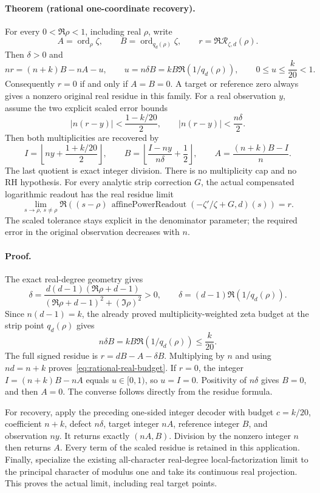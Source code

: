 \paragraph{Theorem (rational one-coordinate recovery).}
For every \(0<\Re\rho<1\), including real \(\rho\), write
\[
 A=\operatorname{ord}_{\rho}\zeta,\qquad
 B=\operatorname{ord}_{q_d(\rho)}\zeta,\qquad
 r=\Re\mathcal R_{\zeta,d}(\rho).
\]
Then \(\delta>0\) and
\begin{equation}\label{eq:rational-real-budget}
 nr=(n+k)B-nA-u,\qquad
 u=n\delta B=kB\Re(1/q_d(\rho)),\qquad
 0\le u\le\frac{k}{20}<1.
\end{equation}
Consequently \(r=0\) if and only if \(A=B=0\). A target or reference zero
always gives a nonzero original real residue in this family.
For a real observation \(y\), assume the two explicit scaled error bounds
\[
 |n(r-y)|<\frac{1-k/20}{2},\qquad
 |n(r-y)|<\frac{n\delta}{2}.
\]
Then both multiplicities are recovered by
\[
 I=\left\lfloor ny+\frac{1+k/20}{2}\right\rfloor,\qquad
 B=\left\lfloor\frac{I-ny}{n\delta}+\frac12\right\rfloor,
 \qquad A=\frac{(n+k)B-I}{n}.
\]
The last quotient is exact integer division. There is no multiplicity cap
and no RH hypothesis. For every analytic strip correction \(G\), the
actual compensated logarithmic readout has the real residue limit
\[
 \lim_{s\to\rho,\ s\ne\rho}
 \Re\!\left((s-\rho)\,
 \operatorname{affinePowerReadout}(-\zeta'/\zeta+G,d)(s)\right)=r.
\]
The scaled tolerance stays explicit in the denominator parameter; the
required error in the original observation decreases with \(n\).

\paragraph{Proof.}
The exact real-degree geometry gives
\[
 \delta=\frac{d(d-1)(\Re\rho+d-1)}
 {(\Re\rho+d-1)^2+(\Im\rho)^2}>0,
 \qquad \delta=(d-1)\Re(1/q_d(\rho)).
\]
Since \(n(d-1)=k\), the already proved multiplicity-weighted zeta budget
at the strip point \(q_d(\rho)\) gives
\[
 n\delta B=kB\Re(1/q_d(\rho))\le\frac{k}{20}.
\]
The full signed residue is \(r=dB-A-\delta B\). Multiplying by \(n\)
and using \(nd=n+k\) proves~\eqref{eq:rational-real-budget}.
If \(r=0\), the integer \(I=(n+k)B-nA\) equals \(u\in[0,1)\),
so \(u=I=0\). Positivity of \(n\delta\) gives \(B=0\), and then
\(A=0\). The converse follows directly from the residue formula.

For recovery, apply the preceding one-sided integer decoder with budget
\(c=k/20\), coefficient \(n+k\), defect \(n\delta\), target integer
\(nA\), reference integer \(B\), and observation \(ny\).
It returns exactly \((nA,B)\). Division by the nonzero integer \(n\)
then returns \(A\). Every term of the scaled residue is retained in this
application. Finally, specialize the existing all-character real-degree
local-factorization limit to the principal character of modulus one and
take its continuous real projection. This proves the actual limit,
including real target points.

